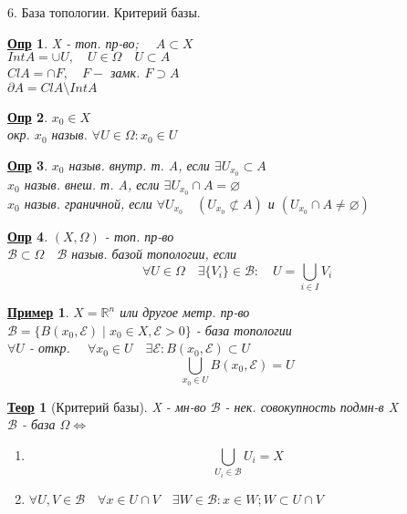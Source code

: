 \documentclass[12pt, fleqn]{article}
\newenvironment{question}[1]{\hspace*{-4em} #1}{\newpage}
\newcommand{\R}{\mathbb{R}}
\newcommand{\B}{\mathcal{B}}
\theoremstyle{nonumbermarginbreak}
\newtheorem{theorem}{\hspace*{-2em}\underline{\bfseries Теор}}[section]
\newtheorem{definition}{\hspace*{-2em}\underline{\bfseries Опр}}[section]
\newtheorem{example}{\hspace*{-2em}\underline{\bfseries Пример}}[section]
\begin{document}
    \begin{question}{6. База топологии. Критерий базы.}
        \begin{definition} 
            X - топ. пр-во; $\quad A \subset X$ \\
            $Int A = \cup U, \quad U \in \Omega \quad U \subset A$\\
            $Cl A = \cap F, \quad F - $ замк. $F \supset A$ \\
            $\partial A = Cl A \setminus Int A$
        \end{definition}

        \begin{definition} 
            $x_0 \in X$\\
            окр. $x_0$ назыв. $\forall U \in \Omega: x_0 \in U$
        \end{definition}

        \begin{definition} 
            $x_0$ назыв. внутр. т. A, если $\exists U_{x_0} \subset A$\\
            $x_0$ назыв. внеш. т. A, если $\exists U_{x_0} \cap A = \varnothing$\\
            $x_0$ назыв. граничной, если $\forall U_{x_0} \quad (U_{x_0} \not \subset A)$ и $(U_{x_0} \cap A \neq \varnothing)$
        \end{definition}

        \begin{definition} 
            $(X, \Omega)$ - топ. пр-во\\
            $\mathcal{B} \subset \Omega \quad \mathcal{B}$ назыв. базой топологии, если\\
            \[\forall U \in \Omega \quad \exists \{V_i\} \in \mathcal{B}: \quad U = \bigcup_{i \in I} V_i\] 
        \end{definition}

        \begin{example} 
            $X = \R^n$ или другое метр. пр-во\\
            $\B = \{B(x_0, \mathcal{E}) \; | \; x_0 \in X, \mathcal{E} > 0\}$ - база топологии\\
            $\forall U$ - откр. $\quad \forall x_0 \in U \quad \exists \mathcal{E}: B(x_0, \mathcal{E}) \subset U$\\
            \[\bigcup_{x_0 \in U} B(x_0, \mathcal{E}) = U\]
        \end{example}

        \begin{theorem}[Критерий базы] 
            X - мн-во $\B$ - нек. совокупность подмн-в X\\
            $\B$ - база $\Omega \Leftrightarrow$ \begin{enumerate}
                \item \[\bigcup_{U_i \in \B} U_i = X\]
                \item $\forall U, V \in \B \quad \forall x \in U \cap V \quad \exists W \in \B : x \in W; W \subset U\cap V$
            \end{enumerate}
        \end{theorem}


\end{question}
\end{document}

